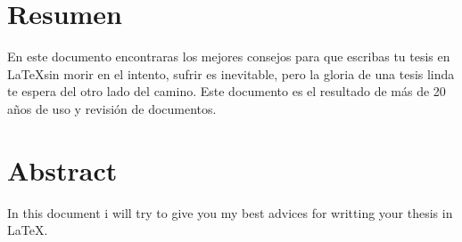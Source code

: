 

\chapter{Resumen}

En este documento encontraras los mejores consejos para que escribas
tu tesis en \LaTeX sin morir en el intento, sufrir es inevitable, pero la gloria
de una tesis linda te espera del otro lado del camino. Este documento es el resultado
 de más de 20 años de uso y revisión de documentos.

\newpage
\thispagestyle{empty}

\chapter{Abstract}
 
In this document i will try to give you my best advices for writting
your thesis in \LaTeX.

\newpage
\thispagestyle{empty}
